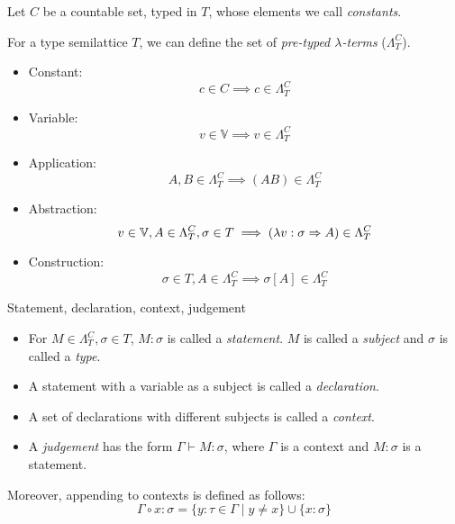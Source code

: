 \documentclass[main.tex]{subfiles}
\begin{document}
\begin{defn}
    Let $C$ be a countable set, typed in $T$,
    whose elements we call \emph{constants}.

    For a type semilattice $T$, we can define the set of
    \emph{pre-typed $\lambda$-terms} ($\Lambda_T^C$).

    \begin{itemize}
        \item Constant:    \[ c \in C \implies c \in \Lambda_T^C \]
        \item Variable:    \[ v \in \mathbb{V} \implies v \in \Lambda_T^C \]
        \item Application: \[ A, B \in \Lambda_T^C \implies (AB) \in \Lambda_T^C \]
        \item Abstraction: \[ v \in \mathbb{V}, A \in \Lambda_T^C, \sigma \in T
                \implies (\lambda v : \sigma \Rightarrow A) \in \Lambda_T^C \]
        \item Construction: \[ \sigma \in T, A \in \Lambda_T^C
                \implies \sigma[A] \in \Lambda_T^C \]
    \end{itemize}
\end{defn}

\begin{defn}
    Statement, declaration, context, judgement
    \begin{itemize}
        \item For $M \in \Lambda_T^C, \sigma \in T$, $M : \sigma$ is called
            a \emph{statement}. $M$ is called a \emph{subject} and $\sigma$
            is called a \emph{type}.
        \item A statement with a variable as a subject is called a \emph{declaration}.
        \item A set of declarations with different subjects is called a \emph{context}.
        \item A \emph{judgement} has the form $\Gamma \vdash M: \sigma$, where
            $\Gamma$ is a context and $M: \sigma$ is a statement.
    \end{itemize}

    Moreover, appending to contexts is defined as follows:
    \[ \Gamma \circ x : \sigma = \{ y : \tau \in \Gamma \mid y \neq x \}
       \cup \{ x : \sigma \} \]
\end{defn}
\end{document}
